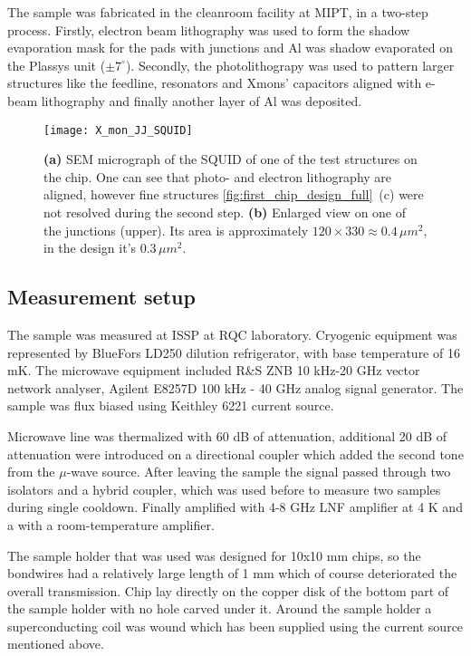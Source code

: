 \documentclass[12pt, twoside]{report}
\numberwithin{equation}{section}
\begin{document}
The sample was fabricated in the cleanroom facility at MIPT, in a two-step process. Firstly, electron beam lithography was used to form the shadow evaporation mask for the pads with junctions and Al was shadow evaporated on the Plassys unit ($\pm 7^\circ$). Secondly, the photolithograpy was used to pattern larger structures like the feedline, resonators and Xmons' capacitors aligned with e-beam lithography and finally another layer of Al was deposited.	

\begin{figure}
\centering
\texttt{[image: X\_mon\_JJ\_SQUID]}
\caption{\textbf{(a)} SEM micrograph of the SQUID of one of the test structures on the chip. One can see that photo- and electron lithography are aligned, however fine structures \autoref{fig:first_chip_design_full}~(c) were not resolved during the second step. \textbf{(b)} Enlarged view on one of the junctions (upper). Its area is approximately $120\times 330\approx 0.4\, \mu m^2$, in the design it's $0.3\,\mu m^2$.} 
\end{figure}

\subsection{Measurement setup}

The sample was measured at ISSP at RQC laboratory. Cryogenic equipment was represented by BlueFors LD250 dilution refrigerator, with base temperature of 16 mK. The microwave equipment included R\&S ZNB 10 kHz-20 GHz vector network analyser,  Agilent E8257D 100 kHz - 40 GHz analog signal generator. The sample was flux biased using Keithley 6221 current source.

Microwave line was thermalized with 60 dB of attenuation, additional 20 dB of attenuation were introduced on a directional coupler which added the second tone from the $\mu$-wave source. After leaving the sample the signal passed through two isolators and a hybrid coupler, which was used before to measure two samples during single cooldown. Finally amplified with 4-8 GHz LNF amplifier at 4 K and a with a room-temperature amplifier.

The sample holder that was used was designed for 10x10 mm chips, so the bondwires had a relatively large length of 1 mm which of course deteriorated the overall transmission. Chip lay directly on the copper disk of the bottom part of the sample holder with no hole carved under it. Around the sample holder a superconducting coil was wound which has been supplied using the current source mentioned above.
\end{document}

